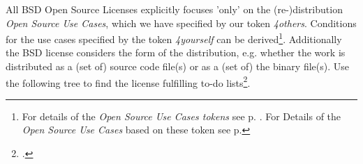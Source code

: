 All BSD Open Source Licenses explicitly focuses 'only' on the (re-)distribution
\textit{Open Source Use Cases}, which we have specified by our token
\textit{4others}. Conditions for the use cases specified by the token
\textit{4yourself} can be derived\footnote{For details of the \textit{Open
Source Use Cases tokens} see p. \pageref{OsucTokens}. For Details of the
\textit{Open Source Use Cases} based on these token see p.
\pageref{OsucDefinitionTree} }. Additionally the BSD license considers the form
of the distribution, e.g. whether the work is distributed as a (set of) source
code file(s) or as a (set of) the binary file(s). Use the following tree to find
the license fulfilling to-do lists\footcite[The BSD license requires, that a
re-distributed software package must contain the (package specific) copyright
notice, the (license specific) conditions and the BSD discaimer. (cf.][\nopage
wp.) You might ask what you should do, if these elements are missed in the
package you got. If so, the package you got had not been licensed adequately.
Hence, you do not know reliably whether you have received it under a BSD
license. In other words: If you have received a BSD licensed software package,
it must contain sufficient license fulfilling elements, or it is not a BSD
licensed software]{BsdLicense2Clause}.

